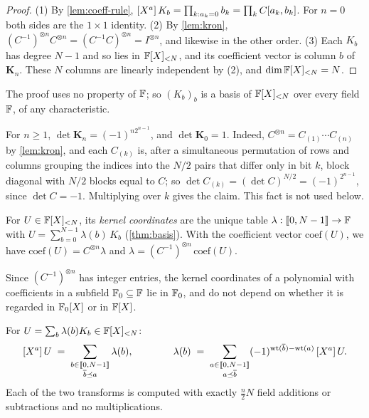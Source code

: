 \begin{proof}
(1) By \cref{lem:coeff-rule}, $[X^{a}]\,K_b = \prod_{k : a_k = 0} b_k = \prod_{k} C[a_k,b_k]$. For $n = 0$ both sides are the $1\times 1$ identity.
(2) By \cref{lem:kron}, $(C^{-1})^{\otimes n} C^{\otimes n} = (C^{-1}C)^{\otimes n} = I^{\otimes n}$, and likewise in the other order.
(3) Each $K_b$ has degree $N-1$ and so lies in $\mathbb{F}[X]_{<N}$, and its coefficient vector is column $b$ of $\mathbf{K}_n$. These $N$ columns are linearly independent by (2), and $\dim \mathbb{F}[X]_{<N} = N$.
\end{proof}

The proof uses no property of $\mathbb{F}$; so $(K_b)_b$ is a basis of $\mathbb{F}[X]_{<N}$ over every field $\mathbb{F}$, of any characteristic.

\begin{remark}[Determinant]\label{rem:det}
For $n \ge 1$, $\det \mathbf{K}_n = (-1)^{n2^{n-1}}$, and $\det \mathbf{K}_0 = 1$.
Indeed, $C^{\otimes n} = C_{(1)} \cdots C_{(n)}$ by \cref{lem:kron}, and each $C_{(k)}$ is, after a simultaneous permutation of rows and columns grouping the indices into the $N/2$ pairs that differ only in bit $k$, block diagonal with $N/2$ blocks equal to $C$; so $\det C_{(k)} = (\det C)^{N/2} = (-1)^{2^{n-1}}$, since $\det C = -1$. Multiplying over $k$ gives the claim. This fact is not used below.
\end{remark}

\begin{definition}\label{def:kernel-coords}
For $U \in \mathbb{F}[X]_{<N}$, its \emph{kernel coordinates} are the unique table $\lambda : \llbracket 0, N-1 \rrbracket \to \mathbb{F}$ with
$U = \sum_{b=0}^{N-1} \lambda(b)\, K_b$ (\cref{thm:basis}).
With the coefficient vector $\mathrm{coef}(U)$, we have $\mathrm{coef}(U) = C^{\otimes n}\lambda$ and $\lambda = (C^{-1})^{\otimes n}\, \mathrm{coef}(U)$.
\end{definition}

Since $(C^{-1})^{\otimes n}$ has integer entries, the kernel coordinates of a polynomial with coefficients in a subfield $\mathbb{F}_0 \subseteq \mathbb{F}$ lie in $\mathbb{F}_0$, and do not depend on whether it is regarded in $\mathbb{F}_0[X]$ or in $\mathbb{F}[X]$.

\begin{corollary}\label{cor:transforms}
For $U = \sum_b \lambda(b) K_b \in \mathbb{F}[X]_{<N}$:
\[
  [X^{a}]\,U \;=\; \sum_{\substack{b \in \llbracket 0, N-1 \rrbracket \\ \overline{b} \preceq a}} \lambda(b),
  \qquad\qquad
  \lambda(b) \;=\; \sum_{\substack{a \in \llbracket 0, N-1 \rrbracket \\ a \preceq \overline{b}}} (-1)^{\mathrm{wt}(\overline{b}) - \mathrm{wt}(a)}\, [X^{a}]\,U .
\]
Each of the two transforms is computed with exactly $\tfrac{n}{2}N$ field additions or subtractions and no multiplications.
\end{corollary}

